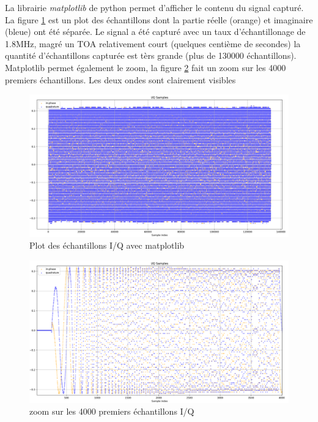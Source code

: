 La librairie \textit{matplotlib} de python permet d'afficher le contenu du signal capturé. La figure  \ref{term309} est un plot des échantillons dont la partie réelle (orange) et imaginaire (bleue) ont été séparée. Le signal a été capturé avec un taux d'échantillonage de 1.8MHz, magré un TOA relativement court (quelques centième de secondes) la quantité d'échantillons capturée est tèrs grande (plus de 130000 échantillons). Matplotlib permet également le zoom, la figure \ref{term310} fait un zoom sur les 4000 premiers échantillons. Les deux ondes sont clairement visibles

\begin{figure}[h]
\centering

\includegraphics[width=\textwidth]{images/iq1.png}
\caption{Plot des échantillons I/Q avec matplotlib}\label{term309}
\end{figure}

\newpage

\begin{figure}[h]
\centering

\includegraphics[width=\textwidth]{images/iq2.png}
\caption{zoom sur les 4000 premiers échantillons I/Q}\label{term310}
\end{figure}


